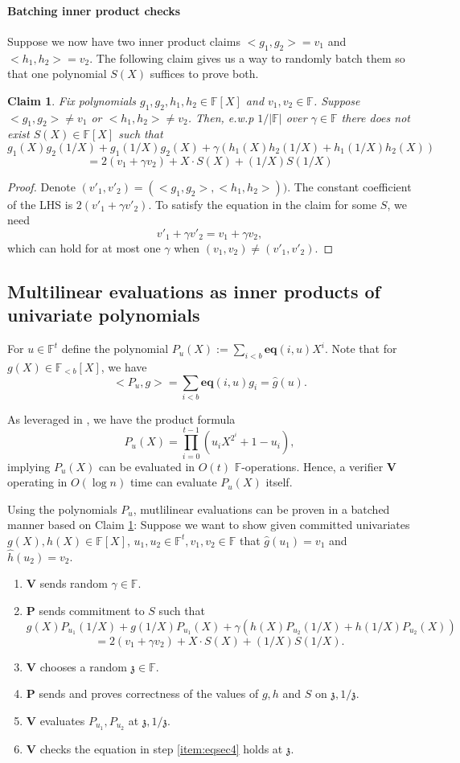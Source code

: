 \documentclass[11pt]{article} %
\newcommand{\F}{\ensuremath{\mathbb F}\xspace}
\newcommand{\defeq}{:=}
\newcommand{\prv}{\ensuremath{\mathsf{\mathbf{P}}}\xspace}
\newcommand{\ver}{\ensuremath{\mathsf{\mathbf{V}}}\xspace}
\newcommand{\polysofdeg}[1]{\ensuremath{\F_{< #1}[X]}\xspace}
\newcommand{\polys}{\ensuremath{\F[X]}\xspace}
\newcommand{\sumi}[1]{\sum_{i< #1}}
\newtheorem{claim}[lemma]{Claim}
\newcommand{\eq}{\ensuremath{\mathsf{eq}}\xspace}
\renewcommand{\eq}{\ensuremath{\mathbf{eq}}\xspace}
\newcommand{\eqpol}[1]{\ensuremath{P_{#1}}\xspace}
\newcommand{\mle}[1]{\ensuremath{\hat{#1}}\xspace}
\newcommand{\prodt}{\ensuremath{\prod_{i=0}^{t-1}}\xspace}
\renewcommand{\zeta}{\mathfrak{z}}
\newcommand{\xinv}{\ensuremath{1/X}\xspace}
\begin{document}
\paragraph{Batching inner product checks}

Suppose we now have two  inner product claims  $<g_1,g_2>=v_1$ and $<h_1,h_2>=v_2$. 
The following claim gives us a way to randomly batch them so that one polynomial $S(X)$ suffices to prove both.
\begin{claim}\label{claim:batchipa}
 Fix polynomials $g_1,g_2,h_1,h_2\in \polys$ and $v_1,v_2\in \F$.
 Suppose $<g_1,g_2>\neq v_1$ or $<h_1,h_2>\neq v_2$. Then, e.w.p $1/|\F|$ over $\gamma\in \F$
 there does not exist $S(X)\in\polys$ such that
\[ g_1(X)g_2(\xinv)+ g_1(\xinv) g_2(X) + \gamma(h_1(X)h_2(\xinv) + h_1(\xinv)h_2(X)) \]
\[= 2(v_1+\gamma v_2) + X\cdot S(X)+(\xinv)S(\xinv)\]
 
\end{claim}
\begin{proof}
Denote $(v'_1,v'_2)=(<g_1,g_2>,<h_1,h_2>))$.
 The constant coefficient of the LHS is $2(v'_1+\gamma v'_2)$.
To satisfy the equation in the claim for some $S$, we need
 \[v'_1+\gamma v'_2=v_1+\gamma v_2,\]
which can hold for at most one $\gamma$ when $(v_1,v_2)\neq (v'_1,v'_2)$.
\end{proof}

\subsection{Multilinear evaluations as inner products of univariate polynomials}\label{sec:eq-polys}
For $u\in \F^{t}$ define the polynomial $\eqpol{u} (X)\defeq  \sumi{b}\eq(i,u)X^i$. 
Note that for $g(X)\in \polysofdeg{b}$, we have
\[<\eqpol{u},g>=\sumi{b}\eq(i,u) g_i = \mle{g}(u).\]

\noindent
As leveraged in \cite{halo}, we have the product formula
\[\eqpol{u}(X)=\prodt\left(u_i X^{2^i}+1-u_i\right),
\]
implying $\eqpol{u}(X)$ can be evaluated in $O(t)$ \F-operations. Hence, a verifier \ver operating in $O(\log n)$ time can evaluate $\eqpol{u}(X)$ itself.

Using the polynomials \eqpol{u}, mutlilinear evaluations can be proven in a batched manner based on Claim \ref{claim:batchipa}:
Suppose we want to show given committed univariates $g(X),h(X)  \in\polys$, $u_1,u_2\in \F^t,v_1,v_2\in \F$ that
$\mle{g}(u_1)=v_1$ and $\mle{h}(u_2)=v_2$.
\begin{enumerate}
 \item \ver sends random $\gamma\in \F$.
 \item\label{item:eqsec4} \prv sends commitment to $S$ such that
\[ g(X)P_{u_1}(1/X)+ g(1/X) P_{u_1}(X) + \gamma(h(X)P_{u_2}(1/X) + h(1/X)P_{u_2}(X))\]
\[= 2(v_1+\gamma v_2) + X\cdot S(X)+(1/X)S(1/X).\]
\item \ver chooses a random $\zeta\in \F$.
\item \prv sends and proves correctness of the values of $g,h$ and $S$ on $\zeta,1/\zeta$. 
\item \ver evaluates $P_{u_1},P_{u_2}$ at $\zeta,1/\zeta$. 
\item \ver checks the equation in step \ref{item:eqsec4} holds at $\zeta$.
\end{enumerate}
\end{document}

